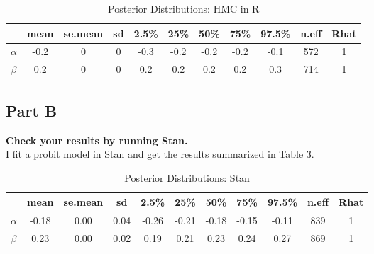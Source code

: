 \documentclass{article}
\begin{document}
\begin{table} [htbp]
\caption {Posterior Distributions: HMC in R}
\vspace{2mm}
\def\arraystretch{1.5}
\centering \begin{tabular}{c c c c c c c c c c c} 
\hline\hline 
\vspace{1mm}
 & mean & se.mean  &  sd   & 2.5\%  &  25\% &   50\% &   75\% & 97.5\% & n.eff & Rhat \\  [0.5ex] \hline
$\alpha$    &    -0.2  &     0 & 0 &-0.3 &-0.2& -0.2& -0.2 & -0.1 &  572 &   1\\
$\beta$    &     0.2  &     0 & 0 & 0.2 & 0.2 & 0.2&  0.2&   0.3 &  714 &   1 \\
\hline 
\end{tabular}
\end{table}

\subsection{Part B}
\textbf{Check your results by running Stan.}\\
I fit a probit model in Stan and get the results summarized in Table 3.
\begin{table} [htbp]
\caption {Posterior Distributions: Stan}
\vspace{2mm}
\def\arraystretch{1.5}
\centering \begin{tabular}{c c c c c c c c c c c} 
\hline\hline 
\vspace{1mm}
 & mean & se.mean  &  sd   & 2.5\%  &  25\% &   50\% &   75\% & 97.5\% & n.eff & Rhat \\  [0.5ex] \hline
$\alpha$    &    -0.18  &  0.00& 0.04&    -0.26 &   -0.21 &   -0.18 &   -0.15 &   -0.11 &  839   & 1\\
$\beta$    &     0.23 &   0.00& 0.02  &   0.19  &   0.21  &   0.23  &   0.24  &   0.27  & 869  &  1 \\
\hline 
\end{tabular}
\end{table}
\end{document}
